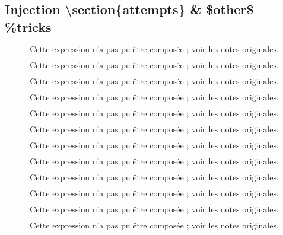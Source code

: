 \documentclass[10pt]{article}
\title{#1}\author{#2}\date{}%
\begin{document}
\begin{clcolumns}

\section*{Injection \textbackslash{}section\{attempts\} \& \$other\$ \%tricks}

\[
\text{Cette expression n’a pas pu être composée ; voir les notes originales.}
\]

\[
\text{Cette expression n’a pas pu être composée ; voir les notes originales.}
\]

\[
\text{Cette expression n’a pas pu être composée ; voir les notes originales.}
\]

\[
\text{Cette expression n’a pas pu être composée ; voir les notes originales.}
\]

\[
\text{Cette expression n’a pas pu être composée ; voir les notes originales.}
\]

\[
\text{Cette expression n’a pas pu être composée ; voir les notes originales.}
\]

\[
\text{Cette expression n’a pas pu être composée ; voir les notes originales.}
\]

\[
\text{Cette expression n’a pas pu être composée ; voir les notes originales.}
\]

\[
\text{Cette expression n’a pas pu être composée ; voir les notes originales.}
\]

\[
\text{Cette expression n’a pas pu être composée ; voir les notes originales.}
\]

\[
\text{Cette expression n’a pas pu être composée ; voir les notes originales.}
\]

\[
\text{Cette expression n’a pas pu être composée ; voir les notes originales.}
\]
\end{clcolumns}
\end{document}
